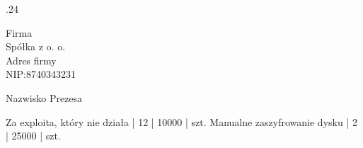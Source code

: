 %




.24

\dla Firma\\Spółka z o. o.\\Adres firmy\\NIP:8740343231

\kto Nazwisko Prezesa



\towar
\artA Za exploita, który nie działa | 12 | 10000 | szt.
\artB Manualne zaszyfrowanie dysku  | 2  | 25000 | szt.


\Fakturuj

\bye


